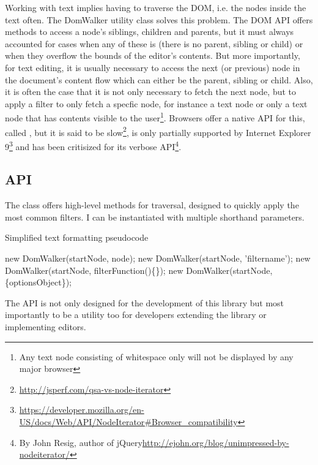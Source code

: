 Working with text implies having to traverse the DOM, i.e. the nodes inside the text often. The {DomWalker} utility class solves this problem. The DOM API offers methods to access a node's siblings, children and parents, but it must always accounted for cases when any of these is  (there is no parent, sibling or child) or when they overflow the bounds of the editor's contents. But more importantly, for text editing, it is usually necessary to access the next (or previous) node in the document's content flow which can either be the parent, sibling or child. Also, it is often the case that it is not only necessary to fetch the next node, but to apply a filter to only fetch a specfic node, for instance a text node or only a text node that has contents visible to the user\footnote{Any text node consisting of whitespace only will not be displayed by any major browser}. Browsers offer a native API for this, called , but it is said to be slow\footnote{\url{http://jsperf.com/qsa-vs-node-iterator}}, is only partially supported by Internet Explorer 9\footnote{\url{https://developer.mozilla.org/en-US/docs/Web/API/NodeIterator\#Browser_compatibility}} and has been critisized for its verbose API\footnote{By John Resig, author of jQuery\url{http://ejohn.org/blog/unimpressed-by-nodeiterator/}}.

\subsection{API}

The  class offers high-level methods for traversal, designed to quickly apply the most common filters. I can be instantiated with multiple shorthand parameters.

\begin{algorithm}
\caption{Simplified text formatting pseudocode}
\label{alg:format_pseudocode}
\begin{algorithmic}[1]
\State new DomWalker(startNode, node);
\State new DomWalker(startNode, 'filtername');
\State new DomWalker(startNode, filterFunction()\{\});
\State new DomWalker(startNode,\{optionsObject\});
\end{algorithmic}
\end{algorithm}

\noindent The API is not only designed for the development of this library but most importantly to be a utility too for developers extending the library or implementing editors.


